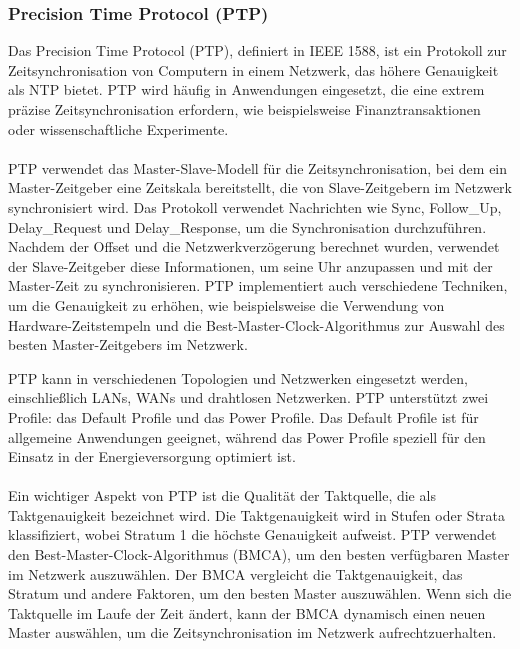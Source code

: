 \documentclass[../vs-script-first-v01.tex]{subfiles}
\begin{document}
\subsubsection{Precision Time Protocol (PTP)}

Das Precision Time Protocol (PTP), definiert in IEEE 1588, ist ein Protokoll zur Zeitsynchronisation von Computern in einem Netzwerk, das höhere Genauigkeit als NTP bietet. PTP wird häufig in Anwendungen eingesetzt, die eine extrem präzise Zeitsynchronisation erfordern, wie beispielsweise Finanztransaktionen oder wissenschaftliche Experimente.
\\\\
PTP verwendet das Master-Slave-Modell für die Zeitsynchronisation, bei dem ein Master-Zeitgeber eine Zeitskala bereitstellt, die von Slave-Zeitgebern im Netzwerk synchronisiert wird. Das Protokoll verwendet Nachrichten wie Sync, Follow\_Up, Delay\_Request und Delay\_Response, um die Synchronisation durchzuführen.
Nachdem der Offset und die Netzwerkverzögerung berechnet wurden, verwendet der Slave-Zeitgeber diese Informationen, um seine Uhr anzupassen und mit der Master-Zeit zu synchronisieren. PTP implementiert auch verschiedene Techniken, um die Genauigkeit zu erhöhen, wie beispielsweise die Verwendung von Hardware-Zeitstempeln und die Best-Master-Clock-Algorithmus zur Auswahl des besten Master-Zeitgebers im Netzwerk.

PTP kann in verschiedenen Topologien und Netzwerken eingesetzt werden, einschließlich LANs, WANs und drahtlosen Netzwerken. PTP unterstützt zwei Profile: das Default Profile und das Power Profile. Das Default Profile ist für allgemeine Anwendungen geeignet, während das Power Profile speziell für den Einsatz in der Energieversorgung optimiert ist.
\\\\
Ein wichtiger Aspekt von PTP ist die Qualität der Taktquelle, die als Taktgenauigkeit bezeichnet wird. Die Taktgenauigkeit wird in Stufen oder Strata klassifiziert, wobei Stratum 1 die höchste Genauigkeit aufweist. PTP verwendet den Best-Master-Clock-Algorithmus (BMCA), um den besten verfügbaren Master im Netzwerk auszuwählen. Der BMCA vergleicht die Taktgenauigkeit, das Stratum und andere Faktoren, um den besten Master auszuwählen. Wenn sich die Taktquelle im Laufe der Zeit ändert, kann der BMCA dynamisch einen neuen Master auswählen, um die Zeitsynchronisation im Netzwerk aufrechtzuerhalten.
\end{document}
